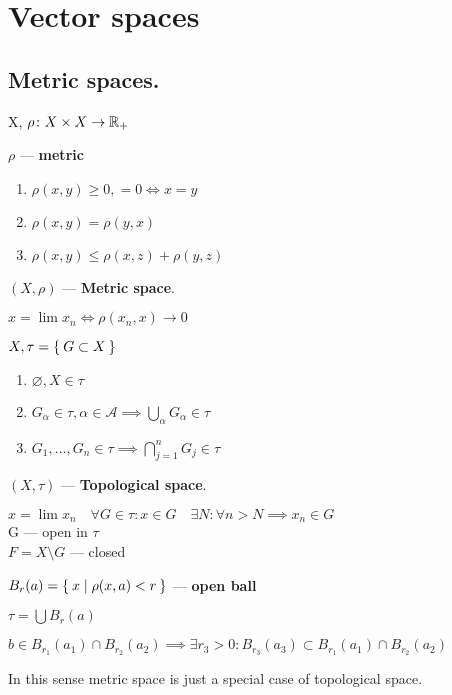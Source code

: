 \chapter{Vector spaces}
\section{Metric spaces.}

X, $\rho\colon X \times X \to \mathbb{R}_+$
\begin{defn}$\rho$ --- \textbf{metric}
  \begin{enumerate}
    \item $\rho(x, y) \geq 0, = 0 \iff x = y$
    \item $\rho(x, y) = \rho (y, x)$
    \item $\rho(x, y) \leq \rho (x, z) + \rho (y, z)$
  \end{enumerate}
\end{defn}
\begin{defn}$(X, \rho)$ --- \textbf{Metric space}.\end{defn}
\begin{defn}$x = \lim x_{n} \iff \rho(x_{n}, x) \to 0$\end{defn}
$X, \tau = \Set{G \subset X}$
\begin{enumerate}
  \item $\varnothing, X \in \tau$
  \item $G_\alpha \in \tau, \alpha \in \mathscr{A} \implies \bigcup\limits_\alpha G_\alpha \in \tau$
  \item $G_1, \dotsc, G_n \in \tau \implies \bigcap\limits_{j = 1}^n G_j \in \tau$
\end{enumerate}
\begin{defn}$(X, \tau)$ --- \textbf{Topological space}.\end{defn}
$x = \lim x_n \quad \forall G \in \tau: x \in G \quad \exists N: \forall n > N \implies x_n \in G$\\
G --- open in $\tau$ \\
$F = X \setminus G$ --- closed
\begin{defn}
  $B_r (a) = \Set{x | \rho(x, a) < r}$ --- \textbf{open ball}
\end{defn}
\noindent
$\tau = \bigcup B_r (a)$
\begin{stm}
  $b \in B_{r_1} (a_1) \cap B_{r_2} (a_2) \implies \exists r_3 > 0: B_{r_3}
  (a_3) \subset B_{r_1} (a_1) \cap B_{r_2} (a_2)$
\end{stm}
\noindent
In this sense metric space is just a special case of topological space.
